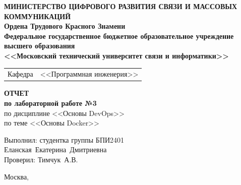 \thispagestyle{empty}

\begin{center}
	\textbf{МИНИСТЕРСТВО ЦИФРОВОГО РАЗВИТИЯ СВЯЗИ И МАССОВЫХ КОММУНИКАЦИЙ} \\
	\textbf{Ордена Трудового Красного Знамени \\
	Федеральное государственное бюджетное образовательное учреждение высшего образования \\
	<<Московский технический университет связи и информатики>>}
\end{center}

\vspace{0.3em}

\begin{center}
	\begin{tabularx}{0.5\textwidth}{p{1.2cm}X}
		Кафедра & \quad <<Программная инженерия>> \\%
	\end{tabularx}
\end{center}

\vspace{12em}

\begin{center}
	\Large
	\textbf{ОТЧЕТ} \\
	\textbf{по лабораторной работе №3} \\
	\large
	по дисциплине <<Основы DevOps>> \\
	по теме <<Основы Docker>>
\end{center}


\vspace{3em}

\begin{flushright}
	Выполнил: 
	студентка группы БПИ2401 \\
	Еланская~Екатерина~Дмитриевна\\
	Проверил: Тимчук~А.В.\\
\end{flushright}

\vspace{8em}

\begin{center}
	Москва,~\the\year
\end{center}
\clearpage


